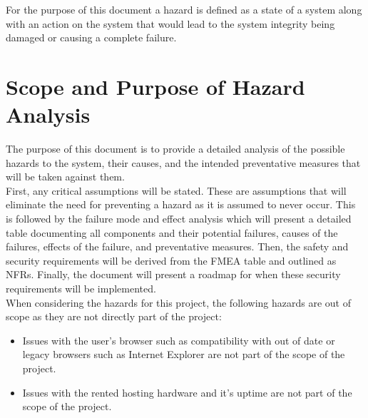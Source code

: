 \documentclass{article}
\begin{document}
	\noindent For the purpose of this document a hazard is defined as a state of a system along with an action on the system that would lead to the system integrity being damaged or causing a complete failure.\\
	
	\section{Scope and Purpose of Hazard Analysis}
	
	The purpose of this document is to provide a detailed analysis of the possible hazards to the system, their causes, and the intended preventative measures that will be taken against them.\\
	
	\noindent First, any critical assumptions will be stated. These are assumptions that will eliminate the need for preventing a hazard as it is assumed to never occur. This is followed by the failure mode and effect analysis which will present a detailed table documenting all components and their potential failures, causes of the failures, effects of the failure, and preventative measures. Then, the safety and security requirements will be derived from the FMEA table and outlined as NFRs. Finally, the document will present a roadmap for when these security requirements will be implemented.\\
	
	\noindent When considering the hazards for this project, the following hazards are out of scope as they are not directly part of the project:
	\begin{itemize}
		\item Issues with the user's browser such as compatibility with out of date or legacy browsers such as Internet Explorer are not part of the scope of the project.
		\item Issues with the rented hosting hardware and it's uptime are not part of the scope of the project.
	\end{itemize}
	
\end{document}
